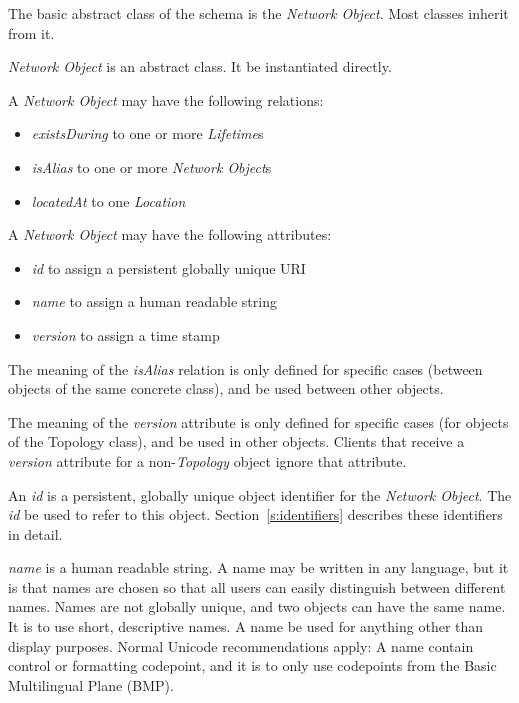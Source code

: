 The basic abstract class of the schema is the \emph{Network Object}.  Most classes inherit from it.

\emph{Network Object} is an abstract class. It \MUSTNOT{} be instantiated directly.

A \emph{Network Object} may have the following relations:
\begin{itemize}
    \item \emph{existsDuring} to one or more \emph{Lifetime}s
    \item \emph{isAlias} to one or more \emph{Network Object}s
    \item \emph{locatedAt} to one \emph{Location} 
\end{itemize}

A \emph{Network Object} may have the following attributes:
\begin{itemize}
    \item \emph{id} to assign a persistent globally unique URI
    \item \emph{name} to assign a human readable string
    \item \emph{version} to assign a time stamp
\end{itemize}

The meaning of the \emph{isAlias} relation is only defined for specific cases (between objects of the same concrete class), and \SHOULDNOT{} be used between other objects.

The meaning of the \emph{version} attribute is only defined for specific cases (for objects of the Topology class), and \SHOULDNOT{} be used in other objects. Clients that receive a \emph{version} attribute for a non-\emph{Topology} object \SHOULD{} ignore that attribute.

An \emph{id} is a persistent, globally unique object identifier for the \emph{Network Object}. The \emph{id} \SHOULD{} be used to refer to this object. Section~\ref{s:identifiers} describes these identifiers in detail.

\emph{name} is a human readable string.
A name may be written in any language, but it is \RECOMMENDED{} that names are chosen so that all users can easily distinguish between different names. Names are not globally unique, and two objects can have the same name. It is \RECOMMENDED{} to use short, descriptive names.
A name \MUSTNOT{} be used for anything other than display purposes.  Normal Unicode recommendations apply: A name \MUSTNOT{} contain control or formatting codepoint, and it is \RECOMMENDED{} to only use codepoints from the Basic Multilingual Plane (BMP).

